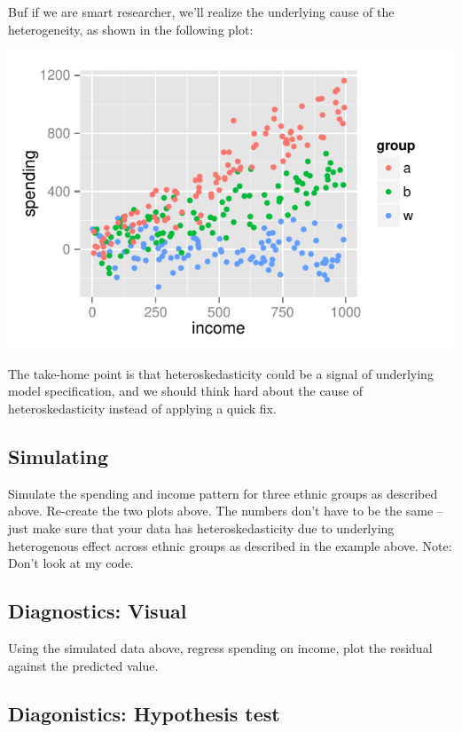 \documentclass{article}\usepackage[]{graphicx}\usepackage[]{color}
\makeatletter
\def\maxwidth{ %
  \ifdim\Gin@nat@width>\linewidth
    \linewidth
  \else
    \Gin@nat@width
  \fi
}
\newenvironment{knitrout}{}{} %
\makeatother
\begin{document}
Buf if we are smart researcher, we'll realize the underlying cause of the heterogeneity, as shown in the following plot:

\begin{knitrout}
\color{fgcolor}
\includegraphics[width=\maxwidth]{figure/unnamed-chunk-3-1} 

\end{knitrout}

The take-home point is that heteroskedasticity could be a signal of underlying model specification, and we should think hard about the cause of heteroskedasticity instead of applying a quick fix.

\subsection{Simulating}

Simulate the spending and income pattern for three ethnic groups as described above. Re-create the two plots above. The numbers don't have to be the same -- just make sure that your data has heteroskedasticity due to underlying heterogenous effect across ethnic groups as described in the example above. Note: Don't look at my code.

\subsection{Diagnostics: Visual}

Using the simulated data above, regress spending on income, plot the residual against the predicted value.

\subsection{Diagonistics: Hypothesis test}
\end{document}
